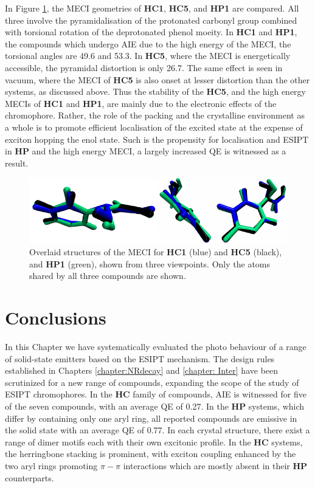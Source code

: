 In Figure \ref{figure: MECI_comparison}, the MECI geometries of \textbf{HC1}, \textbf{HC5}, and \textbf{HP1} are compared. All three involve the pyramidalisation of the protonated carbonyl group  combined with torsional rotation of the deprotonated phenol moeity. In \textbf{HC1} and \textbf{HP1}, the compounds which undergo AIE due to the high energy of the MECI, the torsional angles are 49.6\degree{} and 53.3\degree{}. In \textbf{HC5}, where the MECI is energetically accessible, the pyramidal distortion is only 26.7\degree{}. The same effect is seen in vacuum, where the MECI of \textbf{HC5} is also onset at lesser distortion than the other systems, as discussed above. Thus the stability of the \textbf{HC5}, and the high energy MECIs of \textbf{HC1} and \textbf{HP1}, are mainly due to the electronic effects of the chromophore. Rather, the role of the packing and the crystalline environment as a whole is to promote efficient localisation of the excited state at the expense of exciton hopping the enol state. Such is the propensity for localisation and ESIPT in \textbf{HP} and the high energy MECI, a largely increased QE is witnessed as a result.
\begin{figure}[H]
\centering
  \includegraphics[width=0.9\linewidth]{5ConnectingCrystalStructure/MECI_comparison.pdf}
  \caption[MECI geometries for \textbf{HC1},\textbf{HC5} \% \textbf{HP1}.]{Overlaid structures of the MECI for \textbf{HC1} (blue) and \textbf{HC5} (black), and \textbf{HP1} (green), shown from three viewpoints. Only the atoms shared by all three compounds are shown.}
  \label{figure: MECI_comparison}
\end{figure}
\section{Conclusions}\label{section: Connecting_Conclusions}
In this Chapter we have systematically evaluated the photo behaviour of a range of solid-state emitters based on the ESIPT mechanism. The design rules established in Chapters \ref{chapter:NRdecay} and \ref{chapter: Inter} have been scrutinized for a new range of compounds, expanding the scope of the study of ESIPT chromophores. In the \textbf{HC} family of compounds, AIE is witnessed for five of the seven compounds, with an average QE of 0.27. In the \textbf{HP} systems, which differ by containing only one aryl ring, all reported compounds are emissive in the solid state with an average QE of 0.77. In each crystal structure, there exist a range of dimer motifs each with their own excitonic profile. In the \textbf{HC} systems, the herringbone stacking is prominent, with exciton coupling enhanced by the two aryl rings promoting $\pi-\pi$ interactions which are mostly absent in their \textbf{HP} counterparts.  

